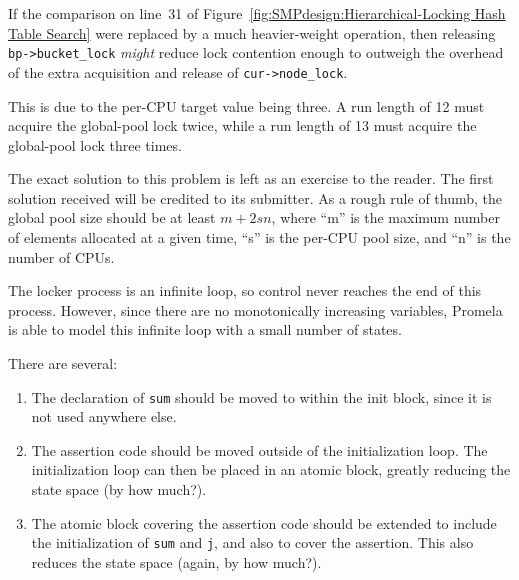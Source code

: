 
	If the comparison on line~31 of
	Figure~\ref{fig:SMPdesign:Hierarchical-Locking Hash Table Search}
	were replaced by a much heavier-weight operation,
	then releasing {\tt bp->bucket\_lock} \emph{might} reduce lock
	contention enough to outweigh the overhead of the extra
	acquisition and release of {\tt cur->node\_lock}.


	This is due to the per-CPU target value being three.
	A run length of 12 must acquire the global-pool lock twice,
	while a run length of 13 must acquire the global-pool lock
	three times.


	The exact solution to this problem is left as an exercise to
	the reader.
	The first solution received will be credited to its submitter.
	As a rough rule of thumb, the global pool size should be at least
	$m+2sn$, where
	``m'' is the maximum number of elements allocated at a given time,
	``s'' is the per-CPU pool size,
	and ``n'' is the number of CPUs.


The locker process is an infinite loop, so control
never reaches the end of this process.
However, since there are no monotonically increasing variables,
Promela is able to model this infinite loop with a small
number of states.


There are several:
\begin{enumerate}
\item	The declaration of {\tt sum} should be moved to within
	the init block, since it is not used anywhere else.
\item	The assertion code should be moved outside of the
	initialization loop.  The initialization loop can
	then be placed in an atomic block, greatly reducing
	the state space (by how much?).
\item	The atomic block covering the assertion code should
	be extended to include the initialization of {\tt sum}
	and {\tt j}, and also to cover the assertion.
	This also reduces the state space (again, by how
	much?).
\end{enumerate}


